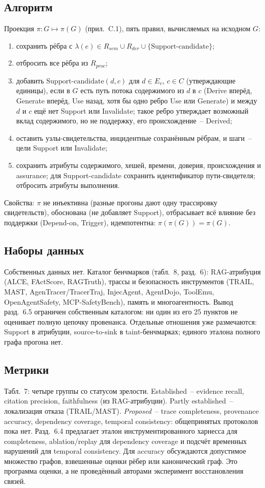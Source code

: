 \subsection{Алгоритм}
Проекция $\pi: G\mapsto\pi(G)$ (прил.~C.1), пять правил, вычисляемых на исходном $G$:
\begin{enumerate}
  \item сохранить рёбра с $\lambda(e)\in R_{sem}\cup R_{der}\cup\{\text{Support-candidate}\}$;
  \item отбросить все рёбра из $R_{proc}$;
  \item добавить $\text{Support-candidate}(d,c)$ для $d\in E_v$, $c\in C$ (утверждающие
        единицы), если в $G$ есть путь потока содержимого из $d$ в $c$ (Derive вперёд,
        Generate вперёд, Use назад, хотя бы одно ребро Use или Generate) и между $d$ и $c$
        ещё нет Support или Invalidate; такое ребро утверждает возможный вклад содержимого,
        но не поддержку, его происхождение~-- Derived;
  \item оставить узлы-свидетельства, инцидентные сохранённым рёбрам, и шаги~-- цели Support
        или Invalidate;
  \item сохранить атрибуты содержимого, хешей, времени, доверия, происхождения и assurance;
        для Support-candidate сохранить идентификатор пути-свидетеля;
        отбросить атрибуты выполнения.
\end{enumerate}
Свойства: $\pi$ не инъективна (разные прогоны дают одну трассировку свидетельств), обоснована
(не добавляет Support), отбрасывает всё влияние без поддержки (Depend-on, Trigger),
идемпотентна: $\pi(\pi(G))=\pi(G)$.

\subsection{Наборы данных}
Собственных данных нет. Каталог бенчмарков (табл.~8, разд.~6): RAG-атрибуция (ALCE, FActScore,
RAGTruth), трассы и безопасность инструментов (TRAIL, MAST, AgenTracer/TracerTraj, InjecAgent,
AgentDojo, ToolEmu, OpenAgentSafety, MCP-SafetyBench), память и многоагентность.
Вывод разд.~6.5 ограничен собственным каталогом: ни один из его 25 пунктов не оценивает
полную цепочку провенанса. Отдельные отношения уже размечаются: Support в атрибуции,
source-to-sink в taint-бенчмарках; единого эталона полного графа прогона нет.

\subsection{Метрики}
Табл.~7: четыре группы со статусом зрелости. Established~-- evidence recall, citation precision,
faithfulness (из RAG-атрибуции). Partly established~-- локализация отказа (TRAIL/MAST).
\emph{Proposed}~-- trace completeness, provenance accuracy, dependency coverage,
temporal consistency: общепринятых протоколов пока нет. Разд.~6.4 предлагает эталон
инструментированного харнесса для completeness, ablation/replay для dependency coverage
и подсчёт временных нарушений для temporal consistency. Для accuracy обсуждаются
допустимое множество графов, взвешенные оценки рёбер или канонический граф.
Это программа оценки, а не проведённый авторами эксперимент восстановления связей.

